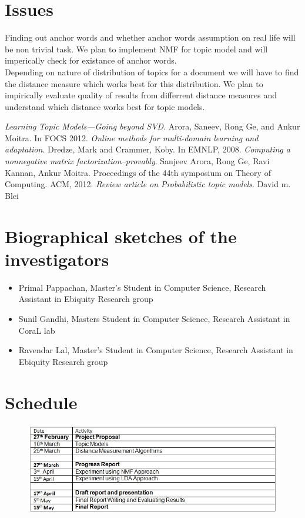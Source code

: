 \documentclass[a4paper,11pt]{article}
\begin{document}
\section{Issues}
Finding out anchor words and whether anchor words assumption on real life will be non trivial task. We plan to implement NMF for topic model and will imperically check for existance of anchor words. \\

Depending on nature of distribution of topics for a document we will have to find the distance measure which works best for this distribution. We plan to impirically evaluate quality of results from differrent distance measures and understand which distance works best for topic models.


\begin{thebibliography}{99}
 \textit{Learning Topic Models---Going beyond SVD}. Arora, Saneev, Rong Ge, and Ankur Moitra. In FOCS 2012.
 \textit{Online methods for multi-domain learning and adaptation}. Dredze, Mark and Crammer, Koby. In
EMNLP, 2008.
 \textit{Computing a nonnegative matrix factorization--provably}. Sanjeev Arora, Rong Ge, Ravi Kannan, Ankur Moitra. Proceedings of the 44th symposium on Theory of Computing. ACM, 2012.  
 \textit{Review article on Probabilistic topic models}. David m. Blei  
\end{thebibliography}

\section{Biographical sketches of the investigators}

\begin{itemize}
\item Primal Pappachan, Master's Student in Computer Science, Research Assistant in Ebiquity Research group
\item Sunil Gandhi, Masters Student in Computer Science, Research Assistant in CoraL lab
\item Ravendar Lal, Master's Student in Computer Science, Research Assistant in Ebiquity Research group
\end{itemize}


\section{Schedule}
\begin{figure}[h]
\includegraphics[scale=0.75]{schedule.jpg}
\end{figure}
\end{document}
